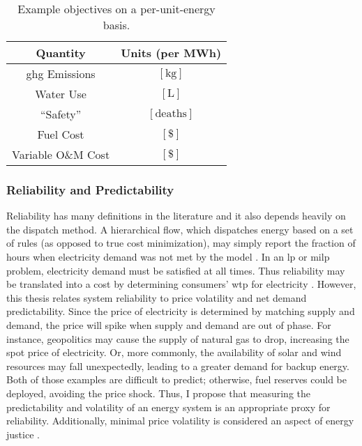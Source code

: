 \begin{table}[h]
    \centering
    \caption{Example objectives on a per-unit-energy basis.}
    \begin{tabular}{cc}
       \toprule
       Quantity  & Units (per MWh)\\
       \midrule
        \acs{ghg} Emissions & $\left[\text{kg}\right]$ \\
        Water Use & $\left[\text{L}\right]$\\
        ``Safety'' & $\left[\text{deaths}\right]$\\
        Fuel Cost & $\left[\text{\$}\right]$\\
        Variable O\&M Cost & $\left[\text{\$}\right]$\\
        \bottomrule
    \end{tabular}
    \label{tab:objectives-per-energy}
\end{table}

\subsubsection{Reliability and Predictability}

Reliability has many definitions in the literature and it also depends heavily
on the dispatch method. A hierarchical flow, which dispatches energy based on a
set of rules (as opposed to true cost minimization), may simply report the
fraction of hours when electricity demand was not met by the model
\cite{donado_hyres_2020,bilil_multiobjective_2014,kamjoo_multi-objective_2016,riou_multi-objective_2021}.
In an \ac{lp} or \ac{milp} problem, electricity demand must be satisfied at all
times. Thus reliability may be translated into a cost by determining consumers'
\ac{wtp} for electricity \cite{gorman_quest_2022, najafi_value_2021}. However,
this thesis relates system reliability to price volatility and net demand
predictability. Since the price of electricity is determined by matching supply
and demand, the price will spike when supply and demand are out of phase. For
instance, geopolitics may cause the supply of natural gas to drop, increasing
the spot price of electricity. Or, more commonly, the availability of solar and
wind resources may fall unexpectedly, leading to a greater demand for backup
energy. Both of those examples are difficult to predict; otherwise, fuel
reserves could be deployed, avoiding the price shock. Thus, I propose that
measuring the predictability and volatility of an energy system is an
appropriate proxy for reliability. Additionally, minimal price volatility is
considered an aspect of energy justice \cite{sovacool_energy_2015,
van_uffelen_revisiting_2022}.

